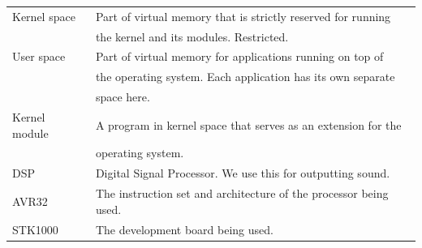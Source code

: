 \documentclass[12pt,a4paper,final]{report}
\numberwithin{equation}{section}
\numberwithin{table}{section}
\numberwithin{figure}{section}
\begin{document}
\begin{table}[H]
\centering
\begin{tabular}{l l}
Kernel space & Part of virtual memory that is strictly reserved for running \\ & the kernel and its modules. Restricted.\\
User space & Part of virtual memory for applications running on top of\\ & the operating system. Each application has its own separate\\ & space here.\\
Kernel module & A program in kernel space that serves as an extension for the\\ & operating system.\\
DSP & Digital Signal Processor. We use this for outputting sound.\\
AVR32 & The instruction set and architecture of the processor being used.\\
STK1000 & The development board being used.\\
\end{tabular}
\label{tab:glossary}
\end{table}



\end{document}
